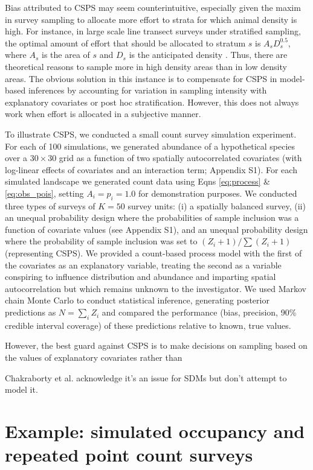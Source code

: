 \documentclass[fleqn,10pt]{wlpeerj}
\begin{document}
Bias attributed to CSPS may seem counterintuitive, especially given the maxim in survey sampling to allocate more effort to strata for which animal density is high. For instance, in large scale line transect surveys under stratified sampling, the optimal amount of effort that should be allocated to stratum $s$ is $A_s D_s^{0.5}$, where $A_s$ is the area of $s$ and $D_s$ is the anticipated density \citep[][eqn 7.7]{BucklandEtAl2001}.  Thus, there are theoretical reasons to sample more in high density areas than in low density areas. The obvious solution in this instance is to compensate for CSPS in model-based inferences by accounting for variation in sampling intensity with explanatory covariates or post hoc stratification. However, this does not always work when effort is allocated in a subjective manner.

To illustrate CSPS, we conducted a small count survey simulation experiment.  For each of 100 simulations, we generated abundance of a hypothetical species over a $30 \times 30$ grid as a function of two spatially autocorrelated covariates (with log-linear effects of covariates and an interaction term; Appendix S1).   For each simulated landscape we generated count data using Eqns \ref{eq:process} \& \ref{eq:obs_pois}, setting $A_i = p_i = 1.0$ for demonstration purposes.  We conducted three types of surveys of $K=50$ survey units: (i) a spatially balanced survey, (ii) an unequal probability design where the probabilities of sample inclusion was a function of covariate values (see Appendix S1), and an unequal probability design where the probability of sample inclusion was set to $(Z_i+1)/\sum(Z_i+1)$ (representing CSPS).  We provided a count-based process model with the first of the covariates as an explanatory variable, treating the second as a variable conspiring to influence distribution and abundance and imparting spatial autocorrelation but which remains unknown to the investigator. We used Markov chain Monte Carlo to conduct statistical inference, generating posterior predictions as $N = \sum_i Z_i$ and compared the performance (bias, precision, 90\% credible interval coverage) of these predictions relative to known, true values.


However, the best guard against CSPS is to make decisions on sampling based on the values of explanatory covariates rather than 

Chakraborty et al. acknowledge it's an issue for SDMs but don't attempt to model it.

\section*{Example: simulated occupancy and repeated point count surveys}
\end{document}

